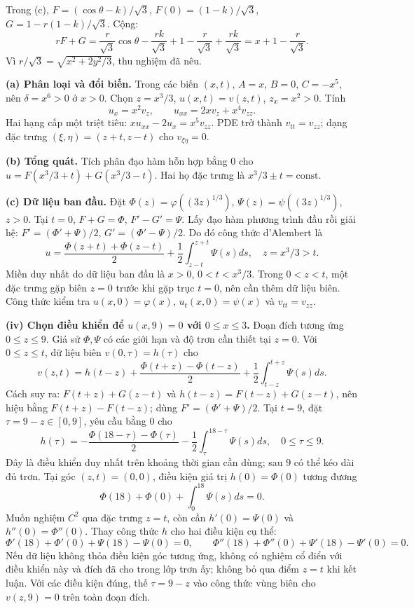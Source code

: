 Trong (c), $F=(\cos\theta-k)/\sqrt3$, $F(0)=(1-k)/\sqrt3$, $G=1-r(1-k)/\sqrt3$. Cộng:
\[rF+G=\frac r{\sqrt3}\cos\theta-\frac{rk}{\sqrt3}+1-\frac r{\sqrt3}+\frac{rk}{\sqrt3}
=x+1-\frac r{\sqrt3}.\]
Vì $r/\sqrt3=\sqrt{x^2+2y^2/3}$, thu nghiệm đã nêu.

\textbf{(a) Phân loại và đổi biến.} Trong các biến $(x,t)$, $A=x$, $B=0$, $C=-x^5$, nên $\delta=x^6>0$ ở $x>0$. Chọn $z=x^3/3$, $u(x,t)=v(z,t)$, $z_x=x^2>0$. Tính
\[u_x=x^2v_z,\qquad u_{xx}=2xv_z+x^4v_{zz}.\]
Hai hạng cấp một triệt tiêu: $xu_{xx}-2u_x=x^5v_{zz}$. PDE trở thành $v_{tt}=v_{zz}$; dạng đặc trưng $(\xi,\eta)=(z+t,z-t)$ cho $v_{\xi\eta}=0$.

\textbf{(b) Tổng quát.} Tích phân đạo hàm hỗn hợp bằng $0$ cho $u=F(x^3/3+t)+G(x^3/3-t)$. Hai họ đặc trưng là $x^3/3\pm t=\mathrm{const}$.

\textbf{(c) Dữ liệu ban đầu.} Đặt $\Phi(z)=\varphi((3z)^{1/3})$, $\Psi(z)=\psi((3z)^{1/3})$, $z>0$. Tại $t=0$, $F+G=\Phi$, $F'-G'=\Psi$. Lấy đạo hàm phương trình đầu rồi giải hệ: $F'=(\Phi'+\Psi)/2$, $G'=(\Phi'-\Psi)/2$. Do đó công thức d'Alembert là
\[\boxed{u=\frac{\Phi(z+t)+\Phi(z-t)}2+\frac12\int_{z-t}^{z+t}\Psi(s)ds,\quad z=x^3/3>t.}\]
Miền duy nhất do dữ liệu ban đầu là $x>0$, $0<t<x^3/3$. Trong $0<z<t$, một đặc trưng gặp biên $z=0$ trước khi gặp trục $t=0$, nên cần thêm dữ liệu biên. Công thức kiểm tra $u(x,0)=\varphi(x)$, $u_t(x,0)=\psi(x)$ và $v_{tt}=v_{zz}$.

\textbf{(iv) Chọn điều khiển để $u(x,9)=0$ với $0\le x\le3$.} Đoạn đích tương ứng $0\le z\le9$. Giả sử $\Phi,\Psi$ có các giới hạn và độ trơn cần thiết tại $z=0$. Với $0\le z\le t$, dữ liệu biên $v(0,\tau)=h(\tau)$ cho
\[v(z,t)=h(t-z)+\frac{\Phi(t+z)-\Phi(t-z)}2+\frac12\int_{t-z}^{t+z}\Psi(s)ds.\]
Cách suy ra: $F(t+z)+G(z-t)$ và $h(t-z)=F(t-z)+G(z-t)$, nên hiệu bằng $F(t+z)-F(t-z)$; dùng $F'=(\Phi'+\Psi)/2$. Tại $t=9$, đặt $\tau=9-z\in[0,9]$, yêu cầu bằng $0$ cho
\[\boxed{h(\tau)=-\frac{\Phi(18-\tau)-\Phi(\tau)}2-\frac12\int_\tau^{18-\tau}\Psi(s)ds,\quad0\le\tau\le9.}\]
Đây là điều khiển duy nhất trên khoảng thời gian cần dùng; sau $9$ có thể kéo dài đủ trơn. Tại góc $(z,t)=(0,0)$, điều kiện giá trị $h(0)=\Phi(0)$ tương đương
\[\Phi(18)+\Phi(0)+\int_0^{18}\Psi(s)ds=0.\]
Muốn nghiệm $C^2$ qua đặc trưng $z=t$, còn cần $h'(0)=\Psi(0)$ và $h''(0)=\Phi''(0)$. Thay công thức $h$ cho hai điều kiện cụ thể:
\[\Phi'(18)+\Phi'(0)+\Psi(18)-\Psi(0)=0,\qquad
\Phi''(18)+\Phi''(0)+\Psi'(18)-\Psi'(0)=0.\]
Nếu dữ liệu không thỏa điều kiện góc tương ứng, không có nghiệm cổ điển với điều khiển này và đích đã cho trong lớp trơn ấy; không bỏ qua điểm $z=t$ khi kết luận. Với các điều kiện đúng, thế $\tau=9-z$ vào công thức vùng biên cho $v(z,9)=0$ trên toàn đoạn đích.


